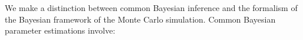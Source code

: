We make a distinction between common Bayesian inference and the formalism
of the Bayesian framework of the Monte Carlo simulation. 
Common Bayesian parameter estimations involve: 
